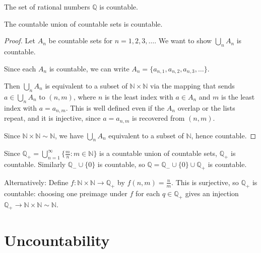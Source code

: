 \documentclass[11pt]{report}
\begin{document}
\begin{exbox}
The set of rational numbers $\mathbb{Q}$ is countable.
\end{exbox}

\begin{propbox}
The countable union of countable sets is countable.
\end{propbox}

\begin{proof}
Let $A_n$ be countable sets for $n = 1, 2, 3, \ldots$. We want to show $\bigcup_n A_n$ is countable.

Since each $A_n$ is countable, we can write $A_n = \{a_{n,1}, a_{n,2}, a_{n,3}, \ldots\}$.

Then $\bigcup_n A_n$ is equivalent to a subset of $\mathbb{N} \times \mathbb{N}$ via the mapping that sends $a \in \bigcup_n A_n$ to $(n, m)$, where $n$ is the least index with $a \in A_n$ and $m$ is the least index with $a = a_{n,m}$. This is well defined even if the $A_n$ overlap or the lists repeat, and it is injective, since $a = a_{n,m}$ is recovered from $(n,m)$.

Since $\mathbb{N} \times \mathbb{N} \sim \mathbb{N}$, we have $\bigcup_n A_n$ equivalent to a subset of $\mathbb{N}$, hence countable.
\end{proof}

\begin{corbox}
Since $\mathbb{Q}_+ = \bigcup_{n=1}^\infty \{\frac{m}{n} : m \in \mathbb{N}\}$ is a countable union of countable sets, $\mathbb{Q}_+$ is countable. Similarly $\mathbb{Q}_- \cup \{0\}$ is countable, so $\mathbb{Q} = \mathbb{Q}_- \cup \{0\} \cup \mathbb{Q}_+$ is countable.

Alternatively: Define $f: \mathbb{N} \times \mathbb{N} \to \mathbb{Q}_+$ by $f(n,m) = \frac{n}{m}$. This is surjective, so $\mathbb{Q}_+$ is countable: choosing one preimage under $f$ for each $q \in \mathbb{Q}_+$ gives an injection $\mathbb{Q}_+ \to \mathbb{N} \times \mathbb{N} \sim \mathbb{N}$.
\end{corbox}

\section{Uncountability}
\end{document}
